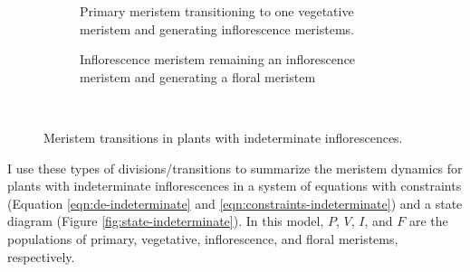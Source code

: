 \documentclass[12pt, oneside]{article}   	%
\begin{document}
\begin{figure}[hbt!]
\begin{subfigure}[h]{.2\textwidth}
          \caption{Primary meristem transitioning to one vegetative meristem and generating inflorescence meristems.} 
  \end{subfigure} 
            \hspace{\fill}
  \begin{subfigure}[h]{.2\textwidth}
    \centering
    \centering

    \caption{Inflorescence meristem remaining an inflorescence meristem and generating a floral meristem}
  \end{subfigure}\
        \caption{Meristem transitions in plants with indeterminate inflorescences.}
        \label{fig:transitions-indeterminate}
\end{figure}

I use these types of divisions/transitions to summarize the meristem dynamics for plants with indeterminate inflorescences in a system of equations with constraints (Equation \ref{eqn:de-indeterminate} and \ref{eqn:constraints-indeterminate}) and a state diagram (Figure \ref{fig:state-indeterminate}). In this model, $P$, $V$, $I$, and $F$ are the populations of primary, vegetative, inflorescence, and floral meristems, respectively. 
\end{document}
